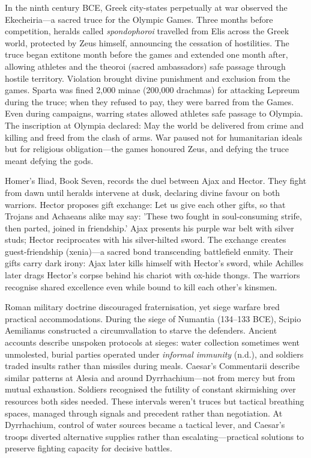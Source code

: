 In the ninth century BCE, Greek city-states perpetually at war observed the Ekecheiria—a sacred truce for the Olympic Games. Three months before competition, heralds called \textit{spondophoroi} travelled from Elis across the Greek world, protected by Zeus himself, announcing the cessation of hostilities. The truce began 	extit{one month} before the games and extended one month after, allowing athletes and the theoroi (sacred ambassadors) safe passage through hostile territory. Violation brought divine punishment and exclusion from the games. Sparta was fined 2{,}000 minae (200{,}000 drachmas) for attacking Lepreum during the truce; when they refused to pay, they were barred from the Games. Even during campaigns, warring states allowed athletes safe passage to Olympia. The inscription at Olympia declared: \QENOpen{}May the world be delivered from crime and killing and freed from the clash of arms.\QENClose{} War paused not for humanitarian ideals but for religious obligation—the games honoured Zeus, and defying the truce meant defying the gods.

Homer's Iliad, Book Seven, records the duel between Ajax and Hector. They fight from dawn until heralds intervene at dusk, declaring divine favour on both warriors. Hector proposes gift exchange: \QENOpen{}Let us give each other gifts, so that Trojans and Achaeans alike may say: 'These two fought in soul-consuming strife, then parted, joined in friendship.'\QENClose{} Ajax presents his purple war belt with silver studs; Hector reciprocates with his silver-hilted sword. The exchange creates guest-friendship (xenia)—a sacred bond transcending battlefield enmity. Their gifts carry dark irony: Ajax later kills himself with Hector's sword, while Achilles later drags Hector's corpse behind his chariot with ox-hide thongs. The warriors recognise shared excellence even while bound to kill each other's kinsmen. 

Roman military doctrine discouraged fraternisation, yet siege warfare bred practical accommodations. During the siege of Numantia (134–133 BCE), Scipio Aemilianus constructed a circumvallation to starve the defenders. Ancient accounts describe unspoken protocols at sieges: water collection sometimes went unmolested, burial parties operated under \textit{informal immunity} (n.d.), and soldiers traded insults rather than missiles during meals. Caesar's Commentarii describe similar patterns at Alesia and around Dyrrhachium—not from mercy but from mutual exhaustion. Soldiers recognised the futility of constant skirmishing over resources both sides needed. These intervals weren't truces but tactical breathing spaces, managed through signals and precedent rather than negotiation. At Dyrrhachium, control of water sources became a tactical lever, and Caesar's troops diverted alternative supplies rather than escalating—practical solutions to preserve fighting capacity for decisive battles.

